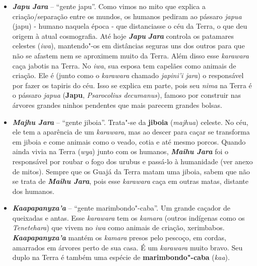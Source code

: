 \begin{itemize}
  disseram certa vez. \emph{\textbf{Takwariroxa'a}} é o próprio
  crepúsculo. As marcas vermelhas que eventualmente aparecem no céu
  durante o pôr"-do"-sol são a trilha feita por
  \emph{\textbf{Takwariroxa'a}}, e é por ela que os \emph{karawara}
  passam levando água da Terra para os patamares celestes. O duplo
  terrestre desse \emph{karawara} são as folhas de uma taquara chamada
  \emph{takwari ruy}.
\item
  \textbf{\emph{Japu} \emph{Jara}} -- ``gente japu''. Como vimos no mito
  que explica a criação/separação entre os mundos, os humanos pediram ao
  pássaro \emph{japua} (japu) - humano naquela época - que distanciasse
  o céu da Terra, o que deu origem à atual cosmografia. Até hoje
  \emph{\textbf{Japu}} \emph{\textbf{Jara}} controla os patamares
  celestes (\emph{iwa}), mantendo"-os em distâncias seguras uns dos
  outros para que não se afastem nem se aproximem muito da Terra. Além
  disso esse \emph{karawara} caça jabotis na Terra. No \emph{iwa}, sua
  esposa tem capelães como animais de criação. Ele é (junto como o
  \emph{karawara} chamado \emph{japini'i jara}) o responsável por fazer
  os tapiris do céu. Isso se explica em parte, pois seu \emph{nima} na
  Terra é o pássaro \emph{japua} (\textbf{Japu}, \emph{Psarocolius
  decumanus}), famoso por construir nas árvores grandes ninhos pendentes
  que mais parecem grandes bolsas.
\item
  \emph{\textbf{Majhu Jara}} -- ``gente jiboia''. Trata"-se da
  \textbf{jiboia} (\emph{majhua}) celeste. No céu, ele tem a aparência
  de um \emph{karawara}, mas ao descer para caçar se transforma em
  jiboia e come animais como o veado, cotia e até mesmo porcos. Quando
  ainda vivia na Terra (\emph{wya}) junto com os humanos,
  \emph{\textbf{Maihu Jara}} foi o responsável por roubar o fogo dos
  urubus e passá-lo à humanidade (ver anexo de mitos). Sempre que os
  Guajá da Terra matam uma jiboia, sabem que não se trata de
  \emph{\textbf{Maihu Jara}}, pois esse \emph{karawara} caça em outras
  matas, distante dos humanos.
\item
  \emph{\textbf{Kaapapanyxa'a}} -- ``gente marimbondo"-caba''. Um grande
  caçador de queixadas e antas. Esse \emph{karawara} tem os
  \emph{kamara} (outros indígenas como os \emph{Tenetehara}) que vivem
  no \emph{iwa} como animais de criação, xerimbabos.
  \emph{\textbf{Kaapapanyxa'a}} mantém os \emph{kamara} presos pelo
  pescoço, em cordas, amarrados em árvores perto de sua casa. É um
  \emph{karawara} muito bravo. Seu duplo na Terra é também uma espécie
  de \textbf{marimbondo"-caba} (\emph{kaa}).

\end{itemize}
